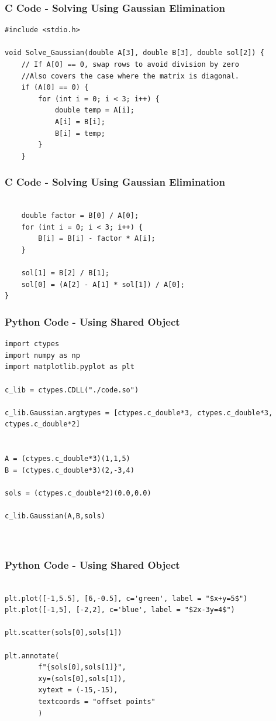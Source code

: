 \documentclass{beamer}
\begin{document}
\begin{frame}[fragile]
    \frametitle{C Code - Solving Using Gaussian Elimination}

    \begin{lstlisting}
#include <stdio.h>

void Solve_Gaussian(double A[3], double B[3], double sol[2]) {
    // If A[0] == 0, swap rows to avoid division by zero
    //Also covers the case where the matrix is diagonal.
    if (A[0] == 0) {
        for (int i = 0; i < 3; i++) {
            double temp = A[i];
            A[i] = B[i];
            B[i] = temp;
        }
    }

    \end{lstlisting}

\end{frame}

\begin{frame}[fragile]
    \frametitle{C Code - Solving Using Gaussian Elimination}

    \begin{lstlisting}
    
    double factor = B[0] / A[0];
    for (int i = 0; i < 3; i++) {
        B[i] = B[i] - factor * A[i];
    }

    sol[1] = B[2] / B[1];
    sol[0] = (A[2] - A[1] * sol[1]) / A[0];
}

    \end{lstlisting}

\end{frame}

\begin{frame}[fragile]
    \frametitle{Python Code - Using Shared Object}
    \begin{lstlisting}
import ctypes
import numpy as np
import matplotlib.pyplot as plt

c_lib = ctypes.CDLL("./code.so")

c_lib.Gaussian.argtypes = [ctypes.c_double*3, ctypes.c_double*3, ctypes.c_double*2]


A = (ctypes.c_double*3)(1,1,5)
B = (ctypes.c_double*3)(2,-3,4)

sols = (ctypes.c_double*2)(0.0,0.0)

c_lib.Gaussian(A,B,sols)



\end{lstlisting}
\end{frame}

\begin{frame}[fragile]
    \frametitle{Python Code - Using Shared Object}
    \begin{lstlisting}

plt.plot([-1,5.5], [6,-0.5], c='green', label = "$x+y=5$")
plt.plot([-1,5], [-2,2], c='blue', label = "$2x-3y=4$")

plt.scatter(sols[0],sols[1])

plt.annotate(
        f"{sols[0],sols[1]}",
        xy=(sols[0],sols[1]),
        xytext = (-15,-15),
        textcoords = "offset points"
        )



\end{lstlisting}
\end{frame}
\end{document}
